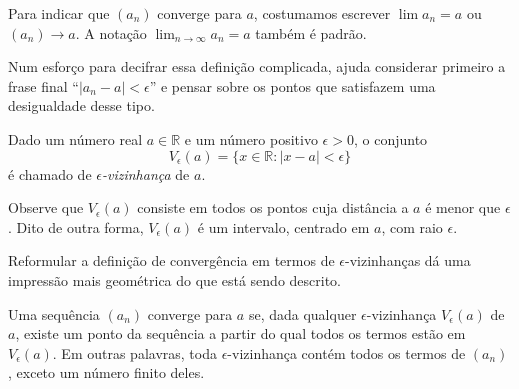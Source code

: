 Para indicar que $(a_n)$ converge para $a$, costumamos escrever $\lim a_n = a$ ou $(a_n) \to a$. A notação $\lim_{n \to \infty} a_n = a$ também é padrão.

Num esforço para decifrar essa definição complicada, ajuda considerar primeiro a frase final ``$|a_n - a| < \epsilon$'' e pensar sobre os pontos que satisfazem uma desigualdade desse tipo.

\begin{definition}\label{def:vizinhanca-epsilon}
Dado um número real $a \in \mathbb{R}$ e um número positivo $\epsilon > 0$, o conjunto
\[
V_\epsilon(a) = \{x \in \mathbb{R} : |x - a| < \epsilon\}
\]
é chamado de \textit{$\epsilon$-vizinhança} de $a$. 
\end{definition}

Observe que $V_\epsilon(a)$ consiste em todos os pontos cuja distância a $a$ é menor que $\epsilon$. Dito de outra forma, $V_\epsilon(a)$ é um intervalo, centrado em $a$, com raio $\epsilon$.

\begin{center}
\end{center}

Reformular a definição de convergência em termos de $\epsilon$-vizinhanças dá uma impressão mais geométrica do que está sendo descrito.

\begin{definition}\label{def:convergencia-topologica}
Uma sequência $(a_n)$ converge para $a$ se, dada qualquer $\epsilon$-vizinhança $V_\epsilon(a)$ de $a$, existe um ponto da sequência a partir do qual todos os termos estão em $V_\epsilon(a)$. Em outras palavras, toda $\epsilon$-vizinhança contém todos os termos de $(a_n)$, exceto um número finito deles. 
\end{definition}

